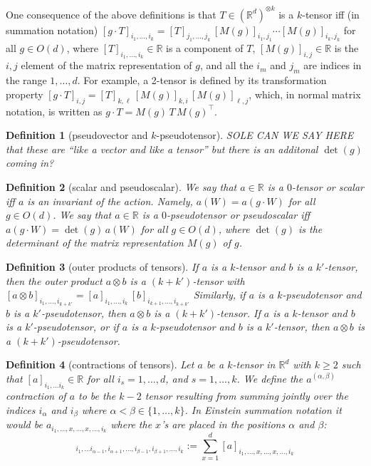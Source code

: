 \documentclass{article}
\theoremstyle{plain}
\newtheorem{definition}{Definition}
\begin{document}
One consequence of the above definitions is that 
$T\in (\mathbb R^d)^{\otimes k}$ is a $k$-tensor iff (in summation notation)
$[g\cdot T]_{i_1,\ldots, i_k} = [T]_{j_1,\ldots,j_k}\,[M(g)]_{i_1,j_1}\cdots[M(g)]_{i_k,j_k}$ for all $g\in O(d)$, where $[T]_{i_1, \ldots ,i_k} \in \mathbb R$ is a component of $T$, $[M(g)]_{i,j}\in\mathbb R$ is the $i,j$ element of the matrix representation of $g$, and all the $i_m$ and $j_m$ are indices in the range $1,\ldots,d$.
For example, a 2-tensor is defined by its transformation property
$[g\cdot T]_{i,j} = [T]_{k,\ell}\,[M(g)]_{k,i}\,[M(g)]_{\ell,j}$,
which, in normal matrix notation, is written as
$g\cdot T = M(g)\,T\,M(g)^\top$.

\begin{definition}[pseudovector and $k$-pseudotensor]
SOLE CAN WE SAY HERE that these are ``like a vector and like a tensor'' but there is an additonal $\det(g)$ coming in?
\end{definition}

\begin{definition}[scalar and pseudoscalar]
We say that $a\in \mathbb R$ is a $0$-tensor or scalar iff $a$ is an invariant of the action.
Namely, $a(W) = a(g\cdot W)$ for all $g\in O(d)$.
We say that
$a\in \mathbb R$ is a $0$-pseudotensor or pseudoscalar iff $a(g \cdot W) = \det(g)\,a(W)$ for all $g\in O(d)$,
where $\det(g)$ is the determinant of the matrix representation $M(g)$ of $g$.
\end{definition}

\begin{definition}[outer products of tensors]
If $a$ is a $k$-tensor and $b$ is a $k'$-tensor, then the outer product $a\otimes b$ is a $(k+k')$-tensor with $[a\otimes b]_{i_1,\ldots,i_{k+k'}} = [a]_{i_1,\ldots,i_k}\,[b]_{i_{k+1},\ldots,i_{k+k'}}$
Similarly, if $a$ is a $k$-pseudotensor and $b$ is a $k'$-pseudotensor, then $a\otimes b$ is a $(k+k')$-tensor.
If $a$ is a $k$-tensor and $b$ is a $k'$-pseudotensor, or if $a$ is a $k$-pseudotensor and $b$ is a $k'$-tensor, then $a\otimes b$ is a $(k+k')$-pseudotensor.
\end{definition}

\begin{definition}[contractions of tensors]
Let $a$ be a $k$-tensor in $\mathbb R^d$ with $k\geq 2$ such that $[a]_{i_1,\ldots i_k}\in \mathbb R$ for all $i_s = 1,\ldots, d$, and $s=1,\ldots, k$. We define the $a^{(\alpha,\beta)}$ contraction of $a$ to be the $k-2$ tensor resulting from summing jointly over the indices $i_\alpha$ and $i_\beta$ where $\alpha < \beta \in\{1,\ldots, k\}$. In Einstein summation notation it would be $a_{i_1, \ldots, x, \ldots , x, \ldots, i_k}$ where the $x$'s are placed in the positions $\alpha$ and $\beta$:
\begin{equation}
[a^{(\alpha,\beta)}]_{i_1,\ldots i_{\alpha-1}, i_{\alpha+1}, \ldots, i_{\beta-1}, i_{\beta+1} , \ldots, i_k} := \sum_{x=1}^d [a]_{i_1, \ldots, x, \ldots , x, \ldots, i_k}
\end{equation}
\end{definition}
\end{document}
